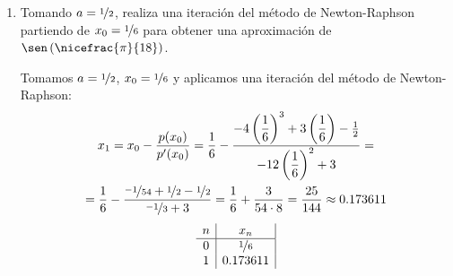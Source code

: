 \begin{ejercicio}
\begin{enumerate}
        \item Tomando $a = \nicefrac{1}{2}$, realiza una iteración del método de Newton-Raphson partiendo de $x_0 = \nicefrac{1}{6}$ para obtener una aproximación de $\sen\left(\nicefrac{\pi}{18}\right)$.
        
        Tomamos $a=\nicefrac{1}{2}$, $x_0=\nicefrac{1}{6}$ y aplicamos una iteración del método de Newton-Raphson:
        \begin{multline*}
            x_1 = x_0 - \dfrac{p(x_0)}{p'(x_0)} = \dfrac{1}{6} - \dfrac{-4\left(\dfrac{1}{6}\right)^3 + 3\left(\dfrac{1}{6}\right) - \frac{1}{2}}{-12\left(\dfrac{1}{6}\right)^2 + 3} =\\= \dfrac{1}{6} - \dfrac{\nicefrac{-1}{54} + \nicefrac{1}{2} - \nicefrac{1}{2}}{\nicefrac{-1}{3}+3} = \dfrac{1}{6} + \frac{3}{54\cdot 8} = \frac{25}{144}\approx 0.173611
        \end{multline*}
        \begin{equation*}
            \begin{array}{c|c|c}
                n & x_n\\ \hline
                0 & \nicefrac{1}{6}\\
                1 & 0.173611
            \end{array}
        \end{equation*}
    \end{enumerate}
\end{ejercicio}